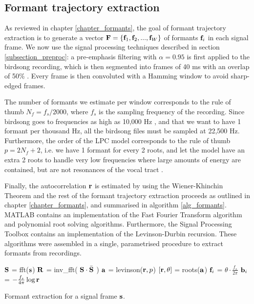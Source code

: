 \documentclass[../main.tex]{subfiles}
\begin{document}
\subsection{Formant trajectory extraction} \label{section_impformants}
As reviewed in chapter \ref{chapter_formants}, the goal of formant trajectory extraction is to generate a vector $\mathbf{F} = \{\mathbf{f}_1, \mathbf{f}_2, ..., \mathbf{f}_W\}$ of formants $\mathbf{f}_i$ in each signal frame. We now use the signal processing techniques described in section \ref{subsection_preproc}: a pre-emphasis filtering with $\alpha = 0.95$ is first applied to the birdsong recording, which is then segmented into frames of 40 ms with an overlap of 50\% \cite{Stowell2014}. Every frame is then convoluted with a Hamming window to avoid sharp-edged frames. 
\par The number of formants we estimate per window corresponds to the rule of thumb $N_f = f_s / 2000$, where $f_s$ is the sampling frequency of the recording. Since birdsong goes to frequencies as high as 10,000 Hz \cite{Marler2004}, and that we want to have 1 formant per thousand Hz, all the birdsong files must be sampled at 22,500 Hz. Furthermore, the order of the LPC model corresponds to the rule of thumb $p = 2N_f + 2$, i.e. we have 1 formant for every 2 roots, and let the model have an extra 2 roots to handle very low frequencies where large amounts of energy are contained, but are not resonances of the vocal tract \cite{Benesty}. 
\par Finally, the autocorrelation $\mathbf{r}$ is estimated by using the Wiener-Khinchin Theorem and the rest of the formant trajectory extraction proceeds as outlined in chapter \ref{chapter_formants}, and summarised in algorithm \ref{alg_formants}. MATLAB contains an implementation of the Fast Fourier Transform algorithm and polynomial root solving algorithms. Furthermore, the Signal Processing Toolbox contains an implementation of the Levinson-Durbin recursion. These algorithms were assembled in a single, parametrised procedure to extract formants from recordings.

\begin{algorithm}
\begin{algorithmic}[1]
\State $\mathbf{S}$ = fft($\mathbf{s}$)
\State $\mathbf{R}$ = inv\_fft( $\mathbf{S} \cdot \bar{\mathbf{S}}$ )
\State $\mathbf{a}$ = levinson($\mathbf{r}, p$)
\State $\left[\mathbf{r}, \theta\right]$ = roots($\mathbf{a}$)
\State $\mathbf{f}_i$ = $\theta \cdot \frac{f_s}{2\pi}$
\State $\mathbf{b}_i$ = $-\frac{f_s}{4\pi}\log{\mathbf{r}}$
\EndFunction
\caption{Formant extraction for a signal frame $\mathbf{s}$.}\label{alg_formants}
\end{algorithmic}
\end{algorithm}
\end{document}
